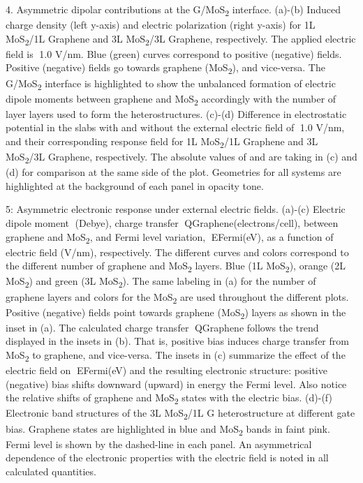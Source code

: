  4. Asymmetric dipolar contributions at the G/MoS\textsubscript{2} interface. (a)-(b) Induced charge density   (left y-axis) and electric polarization   (right y-axis) for 1L MoS\textsubscript{2}/1L Graphene and 3L MoS\textsubscript{2}/3L Graphene, respectively. The applied electric field is 1.0 V/nm. Blue (green) curves correspond to positive (negative) fields. Positive (negative) fields go towards graphene (MoS\textsubscript{2}), and vice-versa. The G/MoS\textsubscript{2} interface is highlighted to show the unbalanced formation of electric dipole moments between graphene and MoS\textsubscript{2} accordingly with the number of layer layers used to form the heterostructures. (c)-(d) Difference in electrostatic potential  in the slabs with and without the external electric field of 1.0 V/nm, and their corresponding response field  for 1L MoS\textsubscript{2}/1L Graphene and 3L MoS\textsubscript{2}/3L Graphene, respectively. The absolute values of   and   are taking in (c) and (d) for comparison at the same side of the plot. Geometries for all systems are highlighted at the background of each panel in opacity tone.  
 
 5: Asymmetric electronic response under external electric fields. (a)-(c) Electric dipole moment (Debye), charge transfer QGraphene(electrons/cell), between graphene and MoS\textsubscript{2}, and Fermi level variation, EFermi(eV), as a function of electric field (V/nm), respectively. The different curves and colors correspond to the different number of graphene and MoS\textsubscript{2} layers. Blue (1L MoS\textsubscript{2}), orange (2L MoS\textsubscript{2}) and green (3L MoS\textsubscript{2}). The same labeling in (a) for the number of graphene layers and colors for the MoS\textsubscript{2} are used throughout the different plots. Positive (negative) fields point towards graphene (MoS\textsubscript{2}) layers as shown in the inset in (a). The calculated charge transfer QGraphene follows the trend displayed in the insets in (b).  That is, positive bias induces charge transfer from MoS\textsubscript{2} to graphene, and vice-versa. The insets in (c) summarize the effect of the electric field on EFermi(eV) and the resulting electronic structure: positive (negative) bias shifts downward (upward) in energy the Fermi level. Also notice the relative shifts of graphene and MoS\textsubscript{2} states with the electric bias. (d)-(f) Electronic band structures of the 3L MoS\textsubscript{2}/1L G heterostructure at different gate bias. Graphene states are highlighted in blue and MoS\textsubscript{2} bands in faint pink. Fermi level is shown by the dashed-line in each panel. An asymmetrical dependence of the electronic properties with the electric field is noted in all calculated quantities. 

